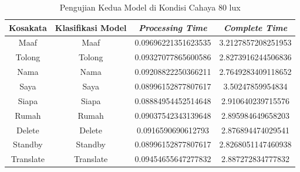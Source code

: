 \begin{longtable}{|c|c|c|c|}
  \caption{Pengujian Kedua Model di Kondisi Cahaya 80 lux}
  \label{tb:prediksiremang2}                                   \\
  \hline
  \rowcolor[HTML]{C0C0C0}
  \textbf{Kosakata} & \textbf{Klasifikasi Model} & \textbf{\emph{Processing Time}} & \textbf{\emph{Complete Time}}\\
  \hline
  Maaf              & Maaf                        & 0.09696221351623535                           & 3.2127857208251953                                  \\
  Tolong            & Tolong                        & 0.09327077865600586                           & 2.8273916244506836                                  \\
  Nama              & Nama                        & 0.09208822250366211                           & 2.7649283409118652                                  \\
  Saya              & Saya                        & 0.08996152877807617                           & 3.50247859954834                                  \\
  Siapa              & Siapa                        & 0.08884954452514648                          & 2.910640239715576                                  \\
  Rumah             & Rumah                       & 0.09037542343139648                           & 2.895984649658203                                  \\
  Delete            & Delete                       & 0.0916590690612793                            & 2.876894474029541                                  \\
  Standby           & Standby                      & 0.08996152877807617                           & 2.8268051147460938                                  \\
  Translate         & Translate                     & 0.09454655647277832                           & 2.887272834777832                                  \\
  \hline
\end{longtable}

